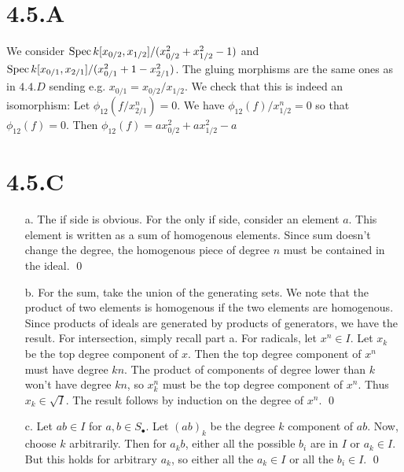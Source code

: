 \documentclass{article}
\begin{document}
\section{4.5.A}
We consider $\operatorname{Spec} k[x_{0/2},x_{1/2}] / (x_{0/2}^2+x_{1/2}^2-1)$ and $\operatorname{Spec} k[x_{0/1},x_{2/1}] / (x_{0/1}^2+1-x_{2/1}^2)$. The gluing morphisms are the same ones as in $4.4.D$ sending e.g. $x_{0/1}=x_{0/2}/x_{1/2}$. We check that this is indeed an isomorphism: Let $\phi_{12}(f/x_{2/1}^n)=0$. We have $\phi_{12}(f)/x_{1/2}^n=0$ so that $\phi_{12}(f)=0$. Then $\phi_{12}(f)=ax_{0/2}^2+ax_{1/2}^2-a$

\section{4.5.C}
\begin{itemize}
    \item[a.] The if side is obvious. For the only if side, consider an element $a$. This element is written as a sum of homogenous elements. Since sum doesn't change the degree, the homogenous piece of degree $n$ must be contained in the ideal. \qed
    \item[b.] For the sum, take the union of the generating sets. We note that the product of two elements is homogenous if the two elements are homogenous. Since products of ideals are generated by products of generators, we have the result. For intersection, simply recall part a. For radicals, let $x^n \in I$. Let $x_k$ be the top degree component of $x$. Then the top degree component of $x^n$ must have degree $kn$. The product of components of degree lower than $k$ won't have degree $kn$, so $x_k^n$ must be the top degree component of $x^n$. Thus $x_k \in \sqrt{I}$. The result follows by induction on the degree of $x^n$. \qed
    \item[c.] Let $ab \in I$ for $a,b \in S_{\bullet}$. Let $(ab)_k$ be the degree $k$ component of $ab$. Now, choose $k$ arbitrarily. Then for $a_kb$, either all the possible $b_i$ are in $I$ or $a_k \in I$. But this holds for arbitrary $a_k$, so either all the $a_k \in I$ or all the $b_i \in I$. \qed
\end{itemize}
\end{document}
